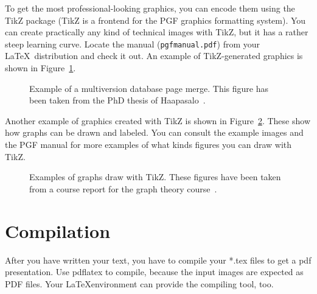 To get the most professional-looking graphics, you can encode them using the
TikZ package (TikZ is a frontend for the PGF graphics formatting system).
You can create practically any kind of technical images with TikZ, but it has a
rather steep learning curve. Locate the manual (\texttt{pgfmanual.pdf}) from
your \LaTeX\ distribution and check it out. An example of TikZ-generated
graphics is shown in Figure~\ref{fig:page-merge}.

\begin{figure}[ht]
  \begin{center}
    
    \caption{Example of a multiversion database page merge. This figure has
    been taken from the PhD thesis of Haapasalo~\cite{HaapasaloThesis}.}
    \label{fig:page-merge}
  \end{center}
\end{figure}

Another example of graphics created with TikZ is shown in
Figure~\ref{fig:tikz-examples}. 
These show how graphs can be drawn and labeled. 
You can consult the example images and the PGF manual for more examples of what
kinds figures you can draw with TikZ. 

\newlength{\graphdotsize}
\setlength{\graphdotsize}{1.7pt}
\newlength{\graphgridsize}
\setlength{\graphgridsize}{1.2em}
\begin{figure}[ht]
\begin{center}
\caption{Examples of graphs draw with TikZ. These figures have been taken from a
course report for the graph theory course~\cite{FerryProblem}.}
\label{fig:tikz-examples}
\end{center}
\end{figure}

\section{Compilation}
\label{section:compilation}

After you have written your text, you have to compile your *.tex files to get 
a pdf presentation. Use pdflatex to compile, because the input images are expected 
as PDF files. Your \LaTeX environment can provide the compiling tool, too.


